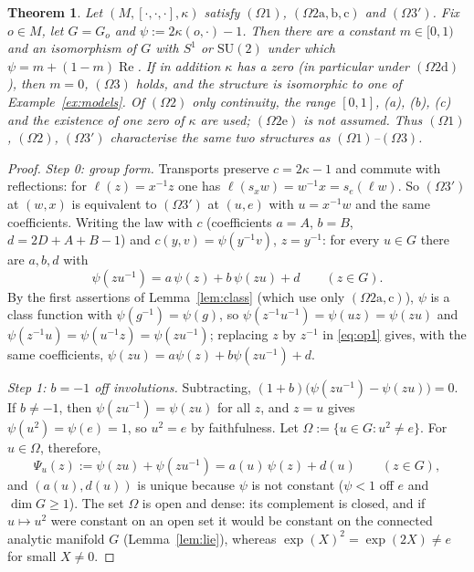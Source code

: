 \documentclass[11pt,reqno]{amsart}
\newtheorem{theorem}{Theorem}[section]
\theoremstyle{definition}
\theoremstyle{remark}
\numberwithin{equation}{section}
\newcommand{\re}{\operatorname{Re}}
\newcommand{\hp}[3]{[#1,#2,#3]}
\newcommand{\SU}{\mathrm{SU}}
\begin{document}
\begin{theorem}\label{thm:operational}
Let $(M,\hp\cdot\cdot\cdot,\kappa)$ satisfy $(\Omega1)$, $(\Omega2\mathrm{a,b,c})$ and $(\Omega3')$.  Fix $o\in M$, let
$G=G_o$ and $\psi:=2\kappa(o,\cdot)-1$.  Then there are a constant $m\in[0,1)$ and an isomorphism of $G$ with $S^1$ or
$\SU(2)$ under which $\psi=m+(1-m)\re$.  If in addition $\kappa$ has a zero (in particular under $(\Omega2\mathrm d)$),
then $m=0$, $(\Omega3)$ holds, and the structure is isomorphic to one of Example~\ref{ex:models}.  Of $(\Omega2)$ only
continuity, the range $[0,1]$, (a), (b), (c) and the existence of one zero of $\kappa$ are used; $(\Omega2\mathrm e)$ is not
assumed.  Thus $(\Omega1)$,
$(\Omega2)$, $(\Omega3')$ characterise the same two structures as $(\Omega1)$--$(\Omega3)$.
\end{theorem}
\begin{proof}
\emph{Step 0: group form.}  Transports preserve $c=2\kappa-1$ and commute with reflections: for
$\ell(z)=x^{-1}z$ one has $\ell(s_xw)=w^{-1}x=s_e(\ell w)$.  So $(\Omega3')$ at $(w,x)$ is equivalent to $(\Omega3')$ at
$(u,e)$ with $u=x^{-1}w$ and the same coefficients.  Writing the law with $c$ (coefficients $a=A$, $b=B$,
$d=2D+A+B-1$) and $c(y,v)=\psi(y^{-1}v)$, $z=y^{-1}$: for every $u\in G$ there are $a,b,d$ with
\begin{equation}\label{eq:op1}
\psi(zu^{-1})=a\,\psi(z)+b\,\psi(zu)+d\qquad(z\in G).
\end{equation}
By the first assertions of Lemma~\ref{lem:class} (which use only $(\Omega2\mathrm{a,c})$), $\psi$ is a class function with $\psi(g^{-1})=\psi(g)$, so $\psi(z^{-1}u^{-1})=\psi(uz)=\psi(zu)$ and
$\psi(z^{-1}u)=\psi(u^{-1}z)=\psi(zu^{-1})$; replacing $z$ by $z^{-1}$ in \eqref{eq:op1} gives, with the same coefficients,
$\psi(zu)=a\psi(z)+b\psi(zu^{-1})+d$.

\emph{Step 1: $b=-1$ off involutions.}  Subtracting, $(1+b)\bigl(\psi(zu^{-1})-\psi(zu)\bigr)=0$.  If $b\ne-1$, then
$\psi(zu^{-1})=\psi(zu)$ for all $z$, and $z=u$ gives $\psi(u^2)=\psi(e)=1$, so $u^2=e$ by faithfulness.  Let
$\Omega:=\{u\in G:u^2\ne e\}$.  For $u\in\Omega$, therefore,
\begin{equation}\label{eq:op2}
\Psi_u(z):=\psi(zu)+\psi(zu^{-1})=a(u)\,\psi(z)+d(u)\qquad(z\in G),
\end{equation}
and $(a(u),d(u))$ is unique because $\psi$ is not constant ($\psi<1$ off $e$ and $\dim G\ge1$).  The set $\Omega$ is
open and dense: its complement is closed, and if $u\mapsto u^2$ were constant on an open set it would be constant on
the connected analytic manifold $G$ (Lemma~\ref{lem:lie}), whereas $\exp(X)^2=\exp(2X)\ne e$ for small $X\ne0$.


\end{proof}
\end{document}
